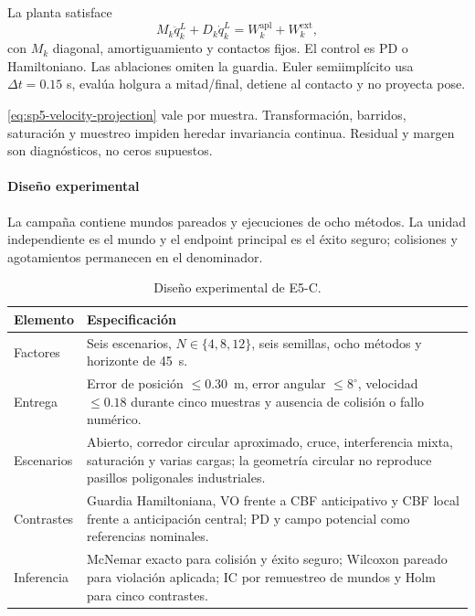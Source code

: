 La planta satisface
\begin{equation}
  M_k\ddot q_k^L+D_k\dot q_k^L=W_k^{\mathrm{apl}}+W_k^{\mathrm{ext}},
  \label{eq:sp5-plant}
\end{equation}
con $M_k$ diagonal, amortiguamiento y contactos fijos. El control es PD o Hamiltoniano. Las ablaciones omiten la guardia. Euler semiimplícito usa $\Delta t=0.15$ s, evalúa holgura a mitad/final, detiene al contacto y no proyecta pose.

\eqref{eq:sp5-velocity-projection} vale por muestra. Transformación, barridos, saturación y muestreo impiden heredar invariancia continua. Residual y margen son diagnósticos, no ceros supuestos.

\paragraph{Diseño experimental}

La campaña contiene \SPFiveWorlds{} mundos pareados y \SPFiveRuns{} ejecuciones de ocho métodos. La unidad independiente es el mundo y el endpoint principal es el éxito seguro; colisiones y agotamientos permanecen en el denominador.

\begin{table}[!htbp]
  \centering
  \caption{Diseño experimental de E5-C.}
  \label{tab:sp5-design}
  \viutablefont
  \begin{tabularx}{0.96\textwidth}{>{\raggedright\arraybackslash}p{2.45cm} Y}
    \toprule
    Elemento & Especificación \\
    \midrule
    Factores & Seis escenarios, $N\in\{4,8,12\}$, seis semillas, ocho métodos y horizonte de 45~s. \\
    Entrega & Error de posición $\leq0.30$~m, error angular $\leq8^\circ$, velocidad $\leq0.18$ durante cinco muestras y ausencia de colisión o fallo numérico. \\
    Escenarios & Abierto, corredor circular aproximado, cruce, interferencia mixta, saturación y varias cargas; la geometría circular no reproduce pasillos poligonales industriales. \\
    Contrastes & Guardia Hamiltoniana, VO frente a CBF anticipativo y CBF local frente a anticipación central; PD y campo potencial como referencias nominales. \\
    Inferencia & McNemar exacto para colisión y éxito seguro; Wilcoxon pareado para violación aplicada; IC por remuestreo de mundos y Holm para cinco contrastes. \\
    \bottomrule
  \end{tabularx}
\end{table}

